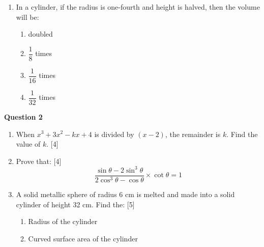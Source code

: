 \begin{enumerate}[label=(\roman*)]
    \item In a cylinder, if the radius is one-fourth and height is halved,
        then the volume will be:

        \begin{multicols}{2}
        \begin{enumerate}[label=(\alph*)]
            \item doubled 
            \item $\dfrac18$ times
            \item $\dfrac{1}{16}$ times
            \item $\dfrac{1}{32}$ times
        \end{enumerate}
        \end{multicols}

\end{enumerate}

\newpage
\par
\noindent
\textbf{Question 2}
\begin{enumerate}[label=(\roman*)]

    \item When $x^3 + 3x^2 - kx + 4$ is divided by $(x-2)$, 
        the remainder is $k$. Find the value of $k$. \hfill [4]

    \item Prove that: \hfill [4]
        \[
            \frac{\sin \theta - 2 \sin^3 \theta}
                 {2 \cos^3 \theta - \cos \theta} 
            \times \cot \theta = 1
        \]

    \item A solid metallic sphere of radius 6 cm is melted 
        and made into a solid cylinder of height 32 cm. Find 
        the: \hfill [5]
        \begin{enumerate}
            \item Radius of the cylinder
            \item Curved surface area of the cylinder
        \end{enumerate}

\end{enumerate}

